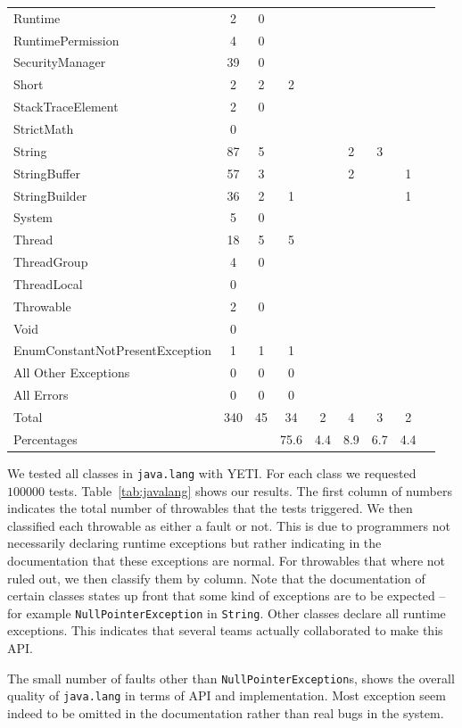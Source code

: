 \begin{table}[h!]
\begin{center}
\begin{tabular}{l c c c c c c c c}
Runtime &2&0&&&&&\\
RuntimePermission &4&0&&&&&\\
SecurityManager &39&0&&&&&\\
Short &2&2&2&&&&\\
StackTraceElement &2&0&&&&&\\
StrictMath &0&&&&&&\\
String &87&5&&&2&3&\\
StringBuffer &57&3&&&2&&1\\
StringBuilder &36&2&1&&&&1\\
System &5&0&&&&&\\
Thread &18&5&5&&&&\\
ThreadGroup &4&0&&&&&\\
ThreadLocal &0&&&&&&\\
Throwable &2&0&&&&&\\
Void&0&&&&&&\\
EnumConstantNotPresentException&1&1&1&&&&\\
All Other Exceptions  &0&0&0&&&&\\
All Errors  &0&0&0&&&&\\
\hline
Total&340&45&34&2&4&3&2\\
\hline
Percentages&&&75.6&4.4&8.9&6.7&4.4\\
\hline
\end{tabular}
\end{center}
\end{table}

We tested all classes in \texttt{java.lang} with YETI. For each class we requested $100000$ tests.
Table~\ref{tab:javalang} shows our results. The first column of numbers indicates the total number of
throwables that the tests triggered. We then classified each throwable as either a fault or not. This is due to programmers not necessarily declaring runtime exceptions but rather indicating in the documentation that these exceptions are normal. For throwables that where not ruled out, 
we then classify them by column. Note that the documentation of certain classes states up front that
some kind of exceptions are to be expected -- for example \texttt{NullPointerException} in \texttt{String}.
Other classes declare all runtime exceptions. This indicates that several teams actually collaborated to make this API. 

The small number of faults other than \texttt{NullPointerException}s, shows the overall quality of \texttt{java.lang} in terms of API and implementation. Most exception seem indeed to be omitted in the documentation rather than real bugs in the system.

